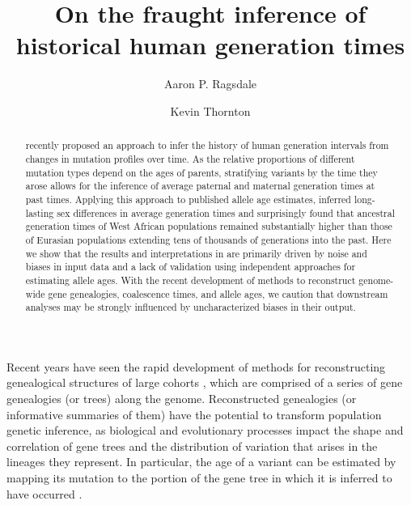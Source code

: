 \documentclass[]{article}
\begin{document}
\title{On the fraught inference of historical human generation times}
\author[1,*]{Aaron P. Ragsdale}
\author[2]{Kevin Thornton}
\maketitle

\begin{abstract}

    \noindent \citet{wang2023human} recently proposed an approach to infer the
    history of human generation intervals from changes in mutation profiles
    over time. As the relative proportions of different mutation types depend
    on the ages of parents, stratifying variants by the time they arose allows
    for the inference of average paternal and maternal generation times at past
    times. Applying this approach to published allele age estimates,
    \citet{wang2023human} inferred long-lasting sex differences in average
    generation times and surprisingly found that ancestral generation times of
    West African populations remained substantially higher than those of
    Eurasian populations extending tens of thousands of generations into the
    past. Here we show that the results and interpretations in
    \citet{wang2023human} are primarily driven by noise and biases in input
    data and a lack of validation using independent approaches for estimating
    allele ages. With the recent development of methods to reconstruct
    genome-wide gene genealogies, coalescence times, and allele ages, we
    caution that downstream analyses may be strongly influenced by
    uncharacterized biases in their output.

\end{abstract}

Recent years have seen the rapid development of methods for reconstructing
genealogical structures of large cohorts
\citep{speidel2019method,wohns2022unified,hubisz2020mapping}, which are
comprised of a series of gene genealogies (or trees) along the genome.
Reconstructed genealogies (or informative summaries of them) have the potential
to transform population genetic inference, as biological and evolutionary
processes impact the shape and correlation of gene trees and the distribution
of variation that arises in the lineages they represent. In particular, the age
of a variant can be estimated by mapping its mutation to the portion of the
gene tree in which it is inferred to have occurred \citep{albers2020dating}.
\end{document}
